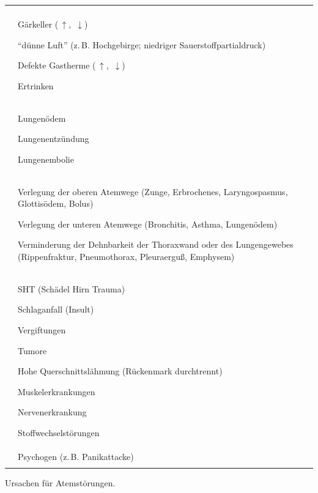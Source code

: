 {}
{}
{}
{\begin{tabulary}{\linewidth}[H]{LL}\addlinespace\toprule\addlinespace
\noindent{}  &
\noindent{}
\\\addlinespace\midrule\addlinespace
\noindent{}
 &
Gärkeller (\,${\uparrow}$, \,${\downarrow}$)

\enquote{dünne Luft} (z.\,B. Hochgebirge;
niedriger Sauerstoffpartialdruck)

Defekte Gastherme (\,${\uparrow}$,
\,${\downarrow}$)

Ertrinken
\\\addlinespace
\noindent{}
 &
Lungenödem

Lungenentzündung

Lungenembolie
\\\addlinespace
\noindent{}
 &
Verlegung der oberen Atemwege (Zunge, Erbrochenes, Laryngospasmus,
         Glottisödem, Bolus)

Verlegung der unteren Atemwege (Bronchitis, Asthma,
Lungenödem)

Verminderung der Dehnbarkeit der Thoraxwand oder des Lungengewebes
     (Rippenfraktur, Pneumothorax, Pleuraerguß, Emphysem)
\\\addlinespace
\noindent{}
 &
SHT (Schädel Hirn Trauma)

Schlaganfall (Insult)

Vergiftungen

Tumore

Hohe Querschnittslähmung (Rückenmark durchtrennt)

Muskelerkrankungen

Nervenerkrankung

Stoffwechselstörungen
\\\addlinespace
\noindent{}
 &
 Psychogen (z.\,B. Panikattacke)
\\\addlinespace\bottomrule
\end{tabulary}}
{Ursachen für
Atemstörungen.\label{tab:atemstoerungen-ursachen}}
{}


